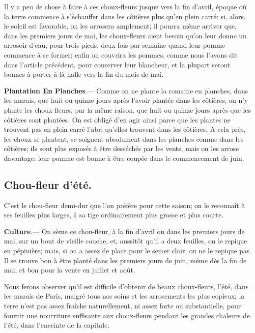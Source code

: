 \documentclass[10pt,a4paper]{book}
\begin{document}
Il y a peu de chose à faire à ces choux-fleurs jusque vers la fin d'avril, époque où la terre commence à s'échauffer dans les côtières plus qu'en plein carré: si, alors, le soleil est favorable, on les arrosera amplement; il pourra même arriver que, dans les premiers jours de mai, les choux-fleurs aient besoin qu'on leur donne un arrosoir d'eau, pour trois pieds, deux fois par semaine quand leur pomme commence à se former; enfin on couvrira les pommes, comme nous l'avons dit dans l'article précédent, pour conserver leur blancheur, et la plupart seront bonnes à porter à là halle vers la fin du mois de mai.

\textbf{Plantation En Planches}.--- Comme on ne plante la romaine en planches, dans les marais, que huit ou quinze jours après l'avoir plantée dans les côtières, on n'y plante les choux-fleurs, par la même raison, que huit ou quinze jours après que les côtières sont plantées. On est obligé d'en agir ainsi parce que les plantes ne trouvent pas en plein carré l'abri qu'elles trouvent dans les côtières. A cela près, les choux se plantent, se soignent absolument dans les planches comme dans les côtières; ils sont plus exposés à être desséchés par les vents, mais on les arrose davantage: leur pomme est bonne à être coupée dans le commencement de juin.

\subsection{Chou-fleur d'été.}

C'est le chou-fleur demi-dur que l'on préfère pour cette saison; on le reconnaît à ses feuilles plus larges, à sa tige ordinairement plus grosse et plus courte.

\textbf{Culture}.--- On sème ce chou-fleur, à la fin d'avril ou dans les premiers jours de mai, sur un bout de vieille couche, et, aussitôt qu'il a deux feuilles, on le repique en pépinière; mais, si on a assez de place pour le semer clair, on ne le repique pas. Il se trouve bon à être planté dans les premiers jours de juin, même dès la fin de mai, et bon pour la vente en juillet et août.

Nous ferons observer qu'il est difficile d'obtenir de beaux choux-fleurs, l'été, dans les marais de Paris, malgré tous nos soins et les arrosements les plus copieux; la terre n'est pas assez fraîche naturellement, ni assez forte ou substantielle, pour fournir une nourriture suffisante aux choux-fleurs pendant les grandes chaleurs de l'été, dans l'enceinte de la capitale.
\end{document}
